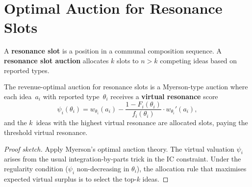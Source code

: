 \section{Optimal Auction for Resonance Slots}
\label{sec:auction}

\begin{definition}
\label{def:slot-auction}
A \textbf{resonance slot} is a position in a communal composition
sequence.  A \textbf{resonance slot auction} allocates $k$ slots
to $n > k$ competing ideas based on reported types.
\end{definition}

\begin{theorem}
\label{thm:optimal-auction}
The revenue-optimal auction for resonance slots is a
Myerson-type auction where each idea~$a_i$
with reported type~$\theta_i$ receives a \textbf{virtual
resonance} score
\[
  \psi_i(\theta_i)
  = w_{\theta_i}(a_i)
  - \frac{1-F_i(\theta_i)}{f_i(\theta_i)}
    \cdot w_{\theta_i}'(a_i),
\]
and the $k$~ideas with the highest virtual resonance are
allocated slots, paying the threshold virtual resonance.
\end{theorem}

\begin{proof}[Proof sketch]
Apply Myerson's optimal auction theory.  The virtual valuation
$\psi_i$ arises from the usual integration-by-parts trick in the
IC constraint.  Under the regularity condition ($\psi_i$
non-decreasing in $\theta_i$), the allocation rule that
maximises expected virtual surplus is to select the top-$k$ ideas.
\end{proof}

